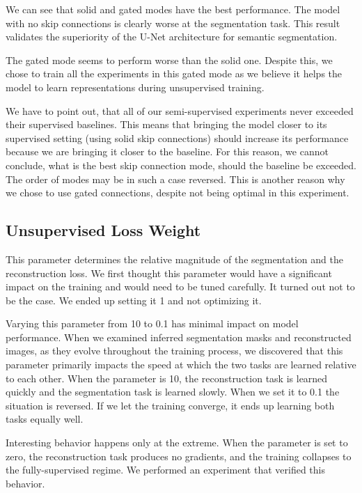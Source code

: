 We can see that solid and gated modes have the best performance. The model with no skip connections is clearly worse at the segmentation task. This result validates the superiority of the U-Net architecture for semantic segmentation.

The gated mode seems to perform worse than the solid one. Despite this, we chose to train all the experiments in this gated mode as we believe it helps the model to learn representations during unsupervised training.

We have to point out, that all of our semi-supervised experiments never exceeded their supervised baselines. This means that bringing the model closer to its supervised setting (using solid skip connections) should increase its performance because we are bringing it closer to the baseline. For this reason, we cannot conclude, what is the best skip connection mode, should the baseline be exceeded. The order of modes may be in such a case reversed. This is another reason why we chose to use gated connections, despite not being optimal in this experiment.


\subsection{Unsupervised Loss Weight}
\label{sec:UnsupervisedLossWeight}

This parameter determines the relative magnitude of the segmentation and the reconstruction loss. We first thought this parameter would have a significant impact on the training and would need to be tuned carefully. It turned out not to be the case. We ended up setting it 1 and not optimizing it.

Varying this parameter from 10 to 0.1 has minimal impact on model performance. When we examined inferred segmentation masks and reconstructed images, as they evolve throughout the training process, we discovered that this parameter primarily impacts the speed at which the two tasks are learned relative to each other. When the parameter is 10, the reconstruction task is learned quickly and the segmentation task is learned slowly. When we set it to 0.1 the situation is reversed. If we let the training converge, it ends up learning both tasks equally well.

Interesting behavior happens only at the extreme. When the parameter is set to zero, the reconstruction task produces no gradients, and the training collapses to the fully-supervised regime. We performed an experiment that verified this behavior.


